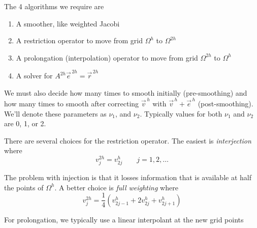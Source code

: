 
The 4 algorithms we require are

\begin{enumerate}[1)]
\item A smoother, like weighted Jacobi
\item A restriction operator to move from grid $\Omega^h$ to $\Omega^{2h}$
\item A prolongation (interpolation) operator to move from grid $\Omega^{2h}$ to $\Omega^h$
\item A solver for $A^{2h}\vec{e}^{\,2h} = \vec{r}^{\,2h}$
\end{enumerate}

We must also decide how many times to smooth initially (pre-smoothing) and how
many times to smooth after correcting $\vec{v}^{\,h}$ with $\vec{v}^{\,h} +
\vec{e}^{\,h}$ (post-smoothing). We'll denote these parameters as $\nu_1$, and
$\nu_2$. Typically values for both $\nu_1$ and $\nu_2$ are 0, 1, or 2. 

There are several choices for the restriction operator. The easiest is
\emph{interjection} where
\begin{equation*}
v_j^{2h} = v_{2j}^h \qquad j=1, 2, \ldots
\end{equation*}
\begin{center}
    
\end{center}


The problem with injection is that it losses information that is available at
half the points of $\Omega^h$. A better choice is \emph{full weighting} where
\begin{equation*}
v_j^{2h} =  \frac{1}{4}\left(  v_{2j-1}^h + 2v_{2j}^h +v_{2j+1}^h \right)
\end{equation*}


\begin{center}
    
\end{center}


For prolongation, we typically use a linear interpolant at the new grid points 

\begin{center}
    
\end{center}

